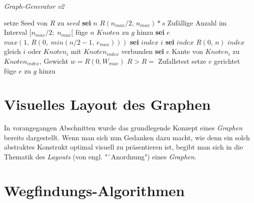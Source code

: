 \documentclass[12pt]{article}
\begin{document}
\renewcommand{\algorithmicrequire}{\textbf{geg.:}}
\renewcommand{\algorithmicensure}{\textbf{ges.:}}
\renewcommand{\algorithmicprocedure}{\textbf{prozedur}}
\renewcommand{\algorithmicfor}{\textbf{für}}
\renewcommand{\algorithmicdo}{\textbf{wiederhole}}
\renewcommand{\algorithmicend}{\textbf{ende}}
\renewcommand{\algorithmicrepeat}{\textbf{wiederhole}}
\renewcommand{\algorithmicif}{\textbf{wenn}}
\renewcommand{\algorithmicthen}{\textbf{dann}}
\renewcommand{\algorithmicuntil}{\textbf{solange}} %
\newcommand{\sei}{\textbf{sei }}

\begin{algorithm}
\caption{\textit{Graph-Generator v2} \label{alg:generatorv2}}
\begin{algorithmic}[1]
\Statex
{}
\Statex
{}
	\State setze Seed von $R$ zu $seed$
	\State \sei $n$ $R(n_{max}/2,\,n_{max}) * s$ \Comment Zufällige Anzahl im Interval $\big[n_{max}/2;\;n_{max}\big[$
	\State füge $n$ $Knoten$ zu $g$ hinzu
		\State \sei $e$ $max(1,\,R(0,\;min(n/2-1,\,e_{max})))$
			\State \sei $index$ $i$
			\Repeat 
			\State \sei $index$ $R(0,\,n)$
			\Until $index$ gleich $i$ oder $Knoten_{i}$ mit $Knoten_{index}$ verbunden
			\State \sei $e$ Kante von $Knoten_{i}$ zu $Knoten_{index}$, Gewicht $w = R(0, W_{max})$
			 \State \Comment $R>R =$ Zufallstest
				\State setze $e$ gerichtet
			\EndIf
			\State füge $e$ zu $g$ hinzu
		\EndFor
	\EndFor
\EndProcedure
\end{algorithmic}
\end{algorithm}

\clearpage
\section{Visuelles Layout des Graphen}
\label{sec:layout}
In vorangegangen Abschnitten wurde das grundlegende Konzept eines \textit{Graphen} bereits dargestellt. Wenn man sich nun Gedanken dazu macht, wie denn ein solch abstraktes Konstrukt optimal visuell zu präsentieren ist,
begibt man sich in die Thematik des \textit{Layouts} (von engl. "`Anordnung") eines \textit{Graphen}.
\newpage

\section{Wegfindungs-Algorithmen}
\newpage
\end{document}
